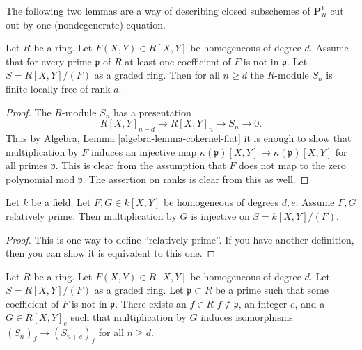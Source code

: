 \noindent
The following two lemmas are a way of describing closed
subschemes of $\mathbf{P}^1_R$ cut out by one (nondegenerate)
equation.

\begin{lemma}
\label{lemma-P1}
Let $R$ be a ring.
Let $F(X, Y) \in R[X, Y]$ be homogeneous of degree
$d$. Assume that for every prime $\mathfrak p$ of $R$
at least one coefficient of $F$ is not in $\mathfrak p$.
Let $S = R[X, Y]/(F)$ as a graded ring.
Then for all $n \geq d$ the $R$-module $S_n$
is finite locally free of rank $d$.
\end{lemma}

\begin{proof}
The $R$-module $S_n$ has a presentation
$$
R[X, Y]_{n-d} \to R[X, Y]_n \to S_n \to 0.
$$
Thus by Algebra, Lemma \ref{algebra-lemma-cokernel-flat}
it is enough to show that multiplication
by $F$ induces an injective map
$\kappa(\mathfrak p)[X, Y]
\to \kappa(\mathfrak p)[X, Y]$
for all primes $\mathfrak p$.
This is clear from the assumption that
$F$ does not map to the zero polynomial mod $\mathfrak p$.
The assertion on ranks is clear from this as well.
\end{proof}

\begin{lemma}
\label{lemma-rel-prime-pols}
Let $k$ be a field. Let $F, G \in k[X, Y]$ be homogeneous
of degrees $d, e$. Assume $F, G$ relatively prime.
Then multiplication by $G$ is injective on $S = k[X, Y]/(F)$.
\end{lemma}

\begin{proof}
This is one way to define ``relatively prime''. If you have another
definition, then you can show it is equivalent to this one.
\end{proof}

\begin{lemma}
\label{lemma-P1-localize}
Let $R$ be a ring. Let $F(X, Y) \in R[X, Y]$ be homogeneous of degree
$d$. Let $S = R[X, Y]/(F)$ as a graded ring.
Let $\mathfrak p \subset R$ be a prime such that
some coefficient of $F$ is not in $\mathfrak p$.
There exists an $f \in R$ $f \not\in \mathfrak p$,
an integer $e$, and a $G \in R[X, Y]_e$
such that multiplication by $G$ induces isomorphisms
$(S_n)_f \to (S_{n + e})_f$ for all $n \geq d$.
\end{lemma}

